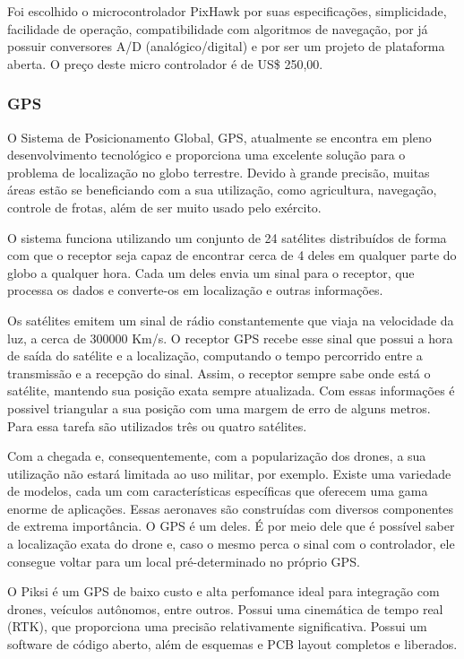 Foi escolhido o microcontrolador PixHawk por suas especificações, simplicidade, facilidade de operação, compatibilidade com algoritmos de navegação, por já possuir conversores A/D (analógico/digital) e por ser um projeto de plataforma aberta. O preço deste micro controlador é de US\$ 250,00.


\subsubsection{GPS}

O Sistema de Posicionamento Global, GPS, atualmente se encontra em pleno desenvolvimento tecnológico e proporciona uma excelente solução para o problema de localização no globo terrestre. Devido à grande precisão, muitas áreas estão se beneficiando com a sua utilização, como agricultura, navegação, controle de frotas, além de ser muito usado pelo exército.\cite{alcoforado2000}

O sistema funciona utilizando um conjunto de 24 satélites distribuídos de forma com que o receptor seja capaz de encontrar cerca de 4 deles em qualquer parte do globo a qualquer hora. Cada um deles envia um sinal para o receptor, que processa os dados e converte-os em localização e outras informações.\cite{alcoforado2000}

Os satélites emitem um sinal de rádio constantemente que viaja na velocidade da luz, a cerca de 300000 Km/s. O receptor GPS recebe esse sinal que possui a hora de saída do satélite e a localização, computando o tempo percorrido entre a transmissão e a recepção do sinal. Assim, o receptor sempre sabe onde está o satélite, mantendo sua posição exata sempre atualizada. Com essas informações é possivel triangular a sua posição com uma margem de erro de alguns metros. Para essa tarefa são utilizados três ou quatro satélites.\cite{rosa2000}

Com  a chegada e, consequentemente, com a popularização dos drones, a sua utilização não estará limitada ao uso militar, por exemplo. Existe uma variedade de modelos, cada um com características específicas que oferecem uma gama enorme de aplicações. Essas aeronaves são construídas com diversos componentes de extrema importância. O GPS é um deles. É por meio dele que é possível saber a localização exata do drone e, caso o mesmo perca o sinal com o controlador, ele consegue voltar para um local pré-determinado no próprio GPS.\cite{moraes1994}

O Piksi é um GPS de baixo custo e alta perfomance ideal para integração com drones, veículos autônomos, entre outros. Possui uma cinemática de tempo real (RTK), que proporciona uma precisão relativamente significativa. Possui um software de código aberto, além de esquemas e PCB layout completos e liberados.\cite{swift2013}

